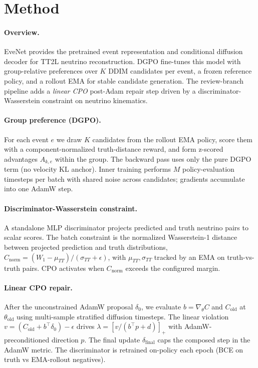 \documentclass[10pt]{article}
\newcommand{\dgAdv}{A}
\begin{document}
\section{Method}
\paragraph{Overview.}
EveNet provides the pretrained event representation and conditional diffusion
decoder for TT2L neutrino reconstruction. DGPO fine-tunes this model with
group-relative preferences over $K$ DDIM candidates per event, a frozen reference
policy, and a rollout EMA for stable candidate generation.
The review-branch pipeline adds a \emph{linear CPO} post-Adam repair step driven
by a discriminator-Wasserstein constraint on neutrino kinematics.

\paragraph{Group preference (DGPO).}
For each event $e$ we draw $K$ candidates from the rollout EMA policy, score them
with a component-normalized truth-distance reward, and form z-scored advantages
$\dgAdv_{k,e}$ within the group. The backward pass uses only the pure DGPO term
(no velocity KL anchor). Inner training performs $M$ policy-evaluation timesteps
per batch with shared noise across candidates; gradients accumulate into one
AdamW step.

\paragraph{Discriminator-Wasserstein constraint.}
A standalone MLP discriminator projects predicted and truth neutrino pairs to
scalar scores. The batch constraint is the normalized Wasserstein-1 distance
between projected prediction and truth distributions,
$C_{\mathrm{norm}} = (W_1 - \mu_{TT}) / (\sigma_{TT} + \epsilon)$,
with $\mu_{TT},\sigma_{TT}$ tracked by an EMA on truth-vs-truth pairs.
CPO activates when $C_{\mathrm{norm}}$ exceeds the configured margin.

\paragraph{Linear CPO repair.}
After the unconstrained AdamW proposal $\delta_0$, we evaluate
$b = \nabla_\theta C$ and $C_{\mathrm{old}}$ at $\theta_{\mathrm{old}}$ using
multi-sample stratified diffusion timesteps. The linear violation
$v = (C_{\mathrm{old}} + b^\top \delta_0) - \epsilon$ drives
$\lambda = [v / (b^\top p + d)]_+$ with AdamW-preconditioned direction $p$.
The final update $\delta_{\mathrm{final}}$ caps the composed step in the
AdamW metric. The discriminator is retrained on-policy each epoch (BCE on truth
vs EMA-rollout negatives).
\end{document}
